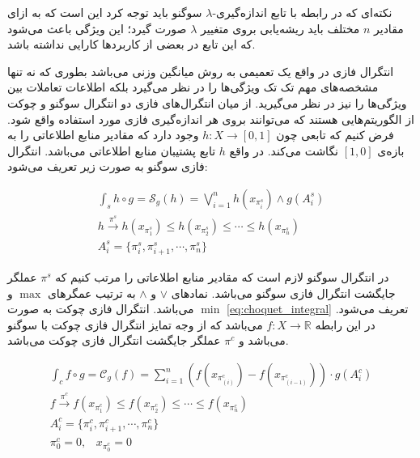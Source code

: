 نکته‌ای که در رابطه با تابع اندازه‌گیری-$\lambda$ سوگنو باید توجه کرد این است که به ازای مقادیر $n$ مختلف باید ریشه‌یابی بروی متغییر $\lambda$ صورت گیرد؛ این ویژگی‌ باعث می‌شود که این تابع در بعضی از کاربردها کارایی نداشته باشد.

انتگرال فازی در واقع یک تعمیمی به روش میانگین وزنی می‌باشد بطوری که نه تنها مشخصه‌های مهم تک تک ویژگی‌ها را در نظر می‌گیرد بلکه اطلاعات تعاملات بین ویژگی‌ها را نیز در نظر می‌گیرید. از میان انتگرال‌های فازی دو انتگرال سوگنو و چوکت از الگوریتم‌هایی هستند که می‌توانند بروی هر اندازه‌گیری‌ فازی مورد استفاده واقع شود. فرض کنیم که تابعی چون
$h : X \rightarrow [0, 1]$
وجود دارد که مقادیر منابع اطلاعاتی را به بازه‌ی $[1, 0]$ نگاشت می‌کند. در واقع $h$ تابع پشتیبان منابع اطلاعاتی می‌باشد. انتگرال فازی سوگنو به صورت زیر تعریف می‌شود:

\begin{eqnarray}
\int_{s} h \circ g = \mathcal{S}_g(h) = \bigvee_{i=1}^{n} h(x_{\pi_i^s}) \wedge g(A_i^s)\label{eq:sugeno_integral}\\
h \xrightarrow{\pi^s} h(x_{\pi_1^s}) \leq h(x_{\pi_2^s}) \leq \cdots \leq h(x_{\pi_n^s})\label{eq:fi_sugeno_perm_op}\\
A_i^s = \{\pi_i^s, \pi_{i+1}^s, \cdots, \pi_n^s\}\label{eq:fi_sugeno_perm_val}
\end{eqnarray}

در انتگرال‌ سوگنو لازم است که مقادیر منابع اطلاعاتی را مرتب کنیم که $\pi^s$ عملگر جایگشت انتگرال فازی سوگنو می‌باشد. نمادهای $\vee$ و $\wedge$ به ترتیب عمگرهای $\max$ و $\min$ می‌باشد. انتگرال فازی چوکت به صورت \ref{eq:choquet_integral} تعریف می‌شود. در این رابطه
$f : X \rightarrow \mathbb{R}$
می‌باشد که از وجه تمایز انتگرال فازی چوکت با سوگنو می‌‌باشد و $\pi^c$ عملگر جایگشت انتگرال فازی چوکت می‌باشد.

\begin{eqnarray}
\int_{c} f \circ g = \mathcal{C}_g(f) = \sum_{i = 1}^{n} \left( f(x_{\pi_{(i)}^c}) - f(x_{\pi_{(i-1)}^c}) \right) \cdot g(A_i^c)\label{eq:choquet_integral}\\
f \xrightarrow{\pi^c} f(x_{\pi_1^c}) \leq f(x_{\pi_2^c}) \leq \cdots \leq f(x_{\pi_n^c})\label{eq:fi_choquet_perm_op}\\
A_i^c = \{\pi_i^c, \pi_{i+1}^c, \cdots, \pi_n^c\}\label{eq:fi_choquet_perm_val}\\
\pi^c_0 = 0, \hspace{10pt} x_{\pi^c_0} = 0
\end{eqnarray}

